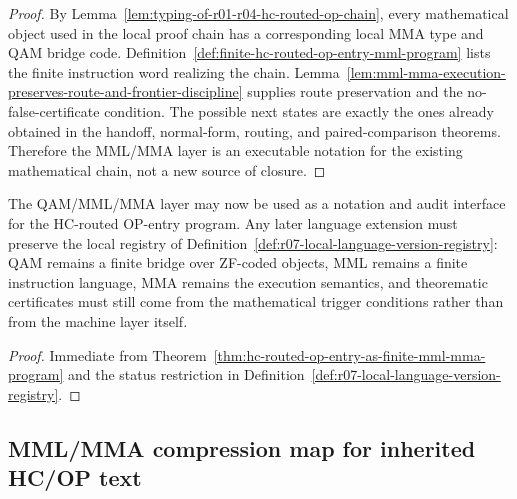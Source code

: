 \begin{proof}
By Lemma~\ref{lem:typing-of-r01-r04-hc-routed-op-chain}, every mathematical object used in the local proof chain has a corresponding local MMA type and QAM bridge code. Definition~\ref{def:finite-hc-routed-op-entry-mml-program} lists the finite instruction word realizing the chain. Lemma~\ref{lem:mml-mma-execution-preserves-route-and-frontier-discipline} supplies route preservation and the no-false-certificate condition. The possible next states are exactly the ones already obtained in the handoff, normal-form, routing, and paired-comparison theorems. Therefore the MML/MMA layer is an executable notation for the existing mathematical chain, not a new source of closure.
\end{proof}

\begin{corollary}
\label{cor:v3340-r07-working-rule}
The QAM/MML/MMA layer may now be used as a notation and audit interface for the HC-routed OP-entry program. Any later language extension must preserve the local registry of Definition~\ref{def:r07-local-language-version-registry}: QAM remains a finite bridge over ZF-coded objects, MML remains a finite instruction language, MMA remains the execution semantics, and theorematic certificates must still come from the mathematical trigger conditions rather than from the machine layer itself.
\end{corollary}

\begin{proof}
Immediate from Theorem~\ref{thm:hc-routed-op-entry-as-finite-mml-mma-program} and the status restriction in Definition~\ref{def:r07-local-language-version-registry}.
\end{proof}


\subsection{MML/MMA compression map for inherited HC/OP text}
\label{subsec:mml-mma-compression-map-for-inherited-hcop-text}

